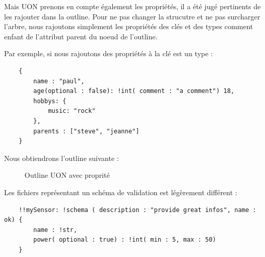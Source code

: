 \documentclass[
    iict, %
    il, %
]{heig-tb}
\begin{document}
Mais UON prenons en compte également les propriétés, il a été jugé pertinents de les rajouter dans la outline.
Pour ne pas changer la strucutre et ne pas surcharger l'arbre,
nous rajoutons simplement les propriétés des clés et des types comment enfant de l'attribut parent du noeud de l'outline.

Par exemple, si nous rajoutons des propriétés à la clé est un type :
\begin{lstlisting}
    {
        name : "paul",
        age(optional : false): !int( comment : "a comment") 18,
        hobbys: {
            music: "rock"
        },
        parents : ["steve", "jeanne"]
    }
\end{lstlisting}

Nous obtiendrons l'outline suivante :

\begin{figure}[!h]
    \begin{center}
    \end{center}
    \caption[Outline UON avec proprité]{\label{uon-payload-outline-with-properties} Outline UON avec proprité}
\end{figure}

Les fichiers représentant un schéma de validation est légèrement différent :

\begin{lstlisting}
    !!mySensor: !schema ( description : "provide great infos", name : ok) {
        name : !str,
        power( optional : true) : !int( min : 5, max : 50)
    }
\end{lstlisting}
\end{document}
